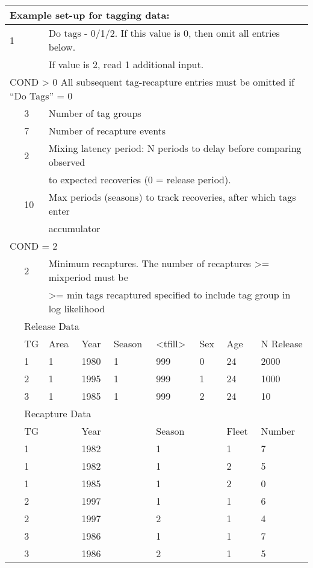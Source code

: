\begin{center}
	\begin{tabular}{p{1.1cm} p{1.1cm} p{1.1cm} p{1.1cm} p{1.1cm} p{1.1cm} p{1.1cm} p{1.1cm} p{3cm}}
		\multicolumn{9}{l}{Example set-up for tagging data:}\\
		\hline
		1 & & \multicolumn{7}{l}{Do tags - 0/1/2. If this value is 0, then omit all entries below.}\\
		&   & \multicolumn{7}{l}{If value is 2, read 1 additional input.}\Tstrut\Bstrut\\
		\hline
		\multicolumn{9}{l}{COND > 0 All subsequent tag-recapture entries must be omitted if ``Do Tags'' = 0}
		 \Tstrut\\

		 & 3 & \multicolumn{7}{l}{Number of tag groups}\Bstrut\\
		 \hline
		 & 7 & \multicolumn{7}{l}{Number of recapture events}\Tstrut\Bstrut\\
		 \hline
		 & 2 & \multicolumn{7}{l}{Mixing latency period: N periods to delay before comparing observed}\Tstrut\\
		 &   &  \multicolumn{7}{l}{to expected recoveries (0 = release period). }\Bstrut\\
		 \hline
		 & 10 & \multicolumn{7}{l}{Max periods (seasons) to track recoveries, after which tags enter}\Tstrut\\
		 &    & \multicolumn{7}{l}{ accumulator}\Bstrut\\
		 \hline
		 \multicolumn{9}{l}{COND = 2} \Tstrut\\
		 &  2 &  \multicolumn{7}{l}{Minimum recaptures. The number of recaptures >= mixperiod must be}\\
		 &    &  \multicolumn{7}{l}{>= min tags recaptured specified to include tag group in log likelihood}\Bstrut\\
		 
		 \hline
		 & \multicolumn{8}{l}{Release Data} \Tstrut\\
		 & TG & Area & Year & Season & <tfill> & Sex & Age & N Release\Bstrut\\ 
		 \hline
		 & 1 & 1 & 1980 & 1 & 999 & 0 & 24 & 2000 \Tstrut\\
		 & 2 & 1 & 1995 & 1 & 999 & 1 & 24 & 1000 \\
		 & 3 & 1 & 1985 & 1 & 999 & 2 & 24 & 10 \Bstrut\\
		 \hline
		 & \multicolumn{8}{l}{Recapture Data}\Tstrut\\
		 & TG &  & Year&  & Season &  & Fleet  & Number\Bstrut\\ 
		 \hline
		 & 1 & & 1982 & & 1 & & 1 & 7 \Tstrut\\
		 & 1 & & 1982 & & 1 & & 2 & 5 \\
		 & 1 & & 1985 & & 1 & & 2 & 0 \\
		 & 2 & & 1997 & & 1 & & 1 & 6 \\
		 & 2 & & 1997 & & 2 & & 1 & 4 \\
		 & 3 & & 1986 & & 1 & & 1 & 7 \\
		 & 3 & & 1986 & & 2 & & 1 & 5 \Bstrut\\
		 \hline
	\end{tabular}
\end{center}

